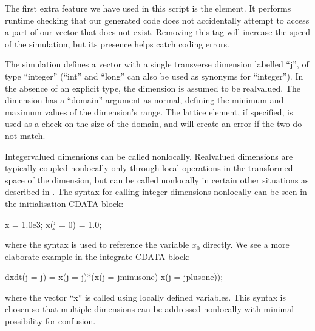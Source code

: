 \documentclass[letterpaper,10pt,english]{sphinxmanual}
\begin{document}
\sphinxAtStartPar
The first extra feature we have used in this script is the  element.  It performs run\sphinxhyphen{}time checking that our generated code does not accidentally attempt to access a part of our vector that does not exist.  Removing this tag will increase the speed of the simulation, but its presence helps catch coding errors.

\sphinxAtStartPar
The simulation defines a vector with a single transverse dimension labelled “j”, of type “integer” (“int” and “long” can also be used as synonyms for “integer”).  In the absence of an explicit type, the dimension is assumed to be real\sphinxhyphen{}valued.  The dimension has a “domain” argument as normal, defining the minimum and maximum values of the dimension’s range.  The lattice element, if specified, is used as a check on the size of the domain, and will create an error if the two do not match.

\sphinxAtStartPar
Integer\sphinxhyphen{}valued dimensions can be called non\sphinxhyphen{}locally.  Real\sphinxhyphen{}valued dimensions are typically coupled non\sphinxhyphen{}locally only through local operations in the transformed space of the dimension, but can be called non\sphinxhyphen{}locally in certain other situations as described in {\hyperref[\detokenize{reference_elements:referencingnonlocal}]{}}.  The syntax for calling integer dimensions non\sphinxhyphen{}locally can be seen in the initialisation CDATA block:

\begin{sphinxVerbatim}[commandchars=\\\{\}]
x = 1.0e\PYGZhy{}3;
x(j =\PYGZgt{} 0) = 1.0;
\end{sphinxVerbatim}

\sphinxAtStartPar
where the syntax  is used to reference the variable \(x_0\) directly.  We see a more elaborate example in the integrate CDATA block:

\begin{sphinxVerbatim}[commandchars=\\\{\}]
dx\PYGZus{}dt(j =\PYGZgt{} j) = x(j =\PYGZgt{} j)*(x(j =\PYGZgt{} j\PYGZus{}minus\PYGZus{}one) \PYGZhy{} x(j =\PYGZgt{} j\PYGZus{}plus\PYGZus{}one));
\end{sphinxVerbatim}

\sphinxAtStartPar
where the vector “x” is called using locally defined variables.  This syntax is chosen so that multiple dimensions can be addressed non\sphinxhyphen{}locally with minimal possibility for confusion.
\end{document}
